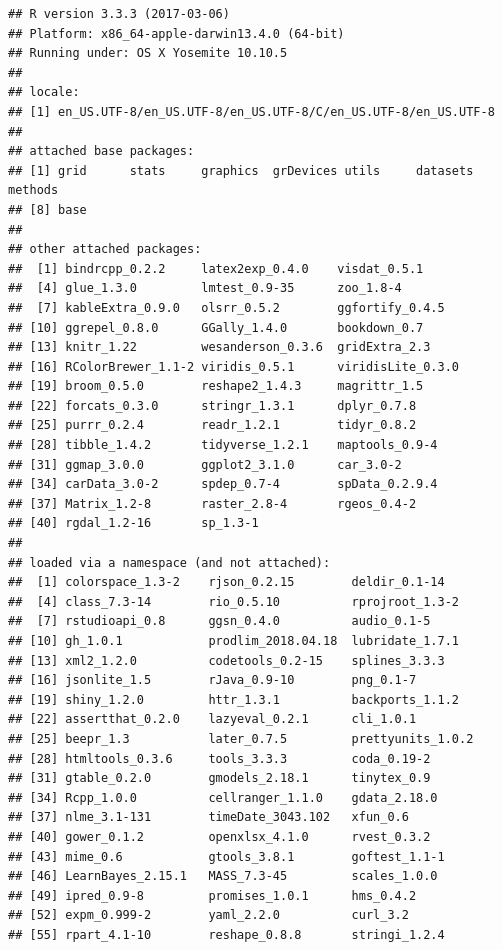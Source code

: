 \documentclass[12pt,a4paper,openany]{book}
\theoremstyle{definition}
\theoremstyle{definition}
\theoremstyle{definition}
\theoremstyle{remark}
\begin{document}
\begin{verbatim}
## R version 3.3.3 (2017-03-06)
## Platform: x86_64-apple-darwin13.4.0 (64-bit)
## Running under: OS X Yosemite 10.10.5
## 
## locale:
## [1] en_US.UTF-8/en_US.UTF-8/en_US.UTF-8/C/en_US.UTF-8/en_US.UTF-8
## 
## attached base packages:
## [1] grid      stats     graphics  grDevices utils     datasets  methods  
## [8] base     
## 
## other attached packages:
##  [1] bindrcpp_0.2.2     latex2exp_0.4.0    visdat_0.5.1      
##  [4] glue_1.3.0         lmtest_0.9-35      zoo_1.8-4         
##  [7] kableExtra_0.9.0   olsrr_0.5.2        ggfortify_0.4.5   
## [10] ggrepel_0.8.0      GGally_1.4.0       bookdown_0.7      
## [13] knitr_1.22         wesanderson_0.3.6  gridExtra_2.3     
## [16] RColorBrewer_1.1-2 viridis_0.5.1      viridisLite_0.3.0 
## [19] broom_0.5.0        reshape2_1.4.3     magrittr_1.5      
## [22] forcats_0.3.0      stringr_1.3.1      dplyr_0.7.8       
## [25] purrr_0.2.4        readr_1.2.1        tidyr_0.8.2       
## [28] tibble_1.4.2       tidyverse_1.2.1    maptools_0.9-4    
## [31] ggmap_3.0.0        ggplot2_3.1.0      car_3.0-2         
## [34] carData_3.0-2      spdep_0.7-4        spData_0.2.9.4    
## [37] Matrix_1.2-8       raster_2.8-4       rgeos_0.4-2       
## [40] rgdal_1.2-16       sp_1.3-1          
## 
## loaded via a namespace (and not attached):
##  [1] colorspace_1.3-2    rjson_0.2.15        deldir_0.1-14      
##  [4] class_7.3-14        rio_0.5.10          rprojroot_1.3-2    
##  [7] rstudioapi_0.8      ggsn_0.4.0          audio_0.1-5        
## [10] gh_1.0.1            prodlim_2018.04.18  lubridate_1.7.1    
## [13] xml2_1.2.0          codetools_0.2-15    splines_3.3.3      
## [16] jsonlite_1.5        rJava_0.9-10        png_0.1-7          
## [19] shiny_1.2.0         httr_1.3.1          backports_1.1.2    
## [22] assertthat_0.2.0    lazyeval_0.2.1      cli_1.0.1          
## [25] beepr_1.3           later_0.7.5         prettyunits_1.0.2  
## [28] htmltools_0.3.6     tools_3.3.3         coda_0.19-2        
## [31] gtable_0.2.0        gmodels_2.18.1      tinytex_0.9        
## [34] Rcpp_1.0.0          cellranger_1.1.0    gdata_2.18.0       
## [37] nlme_3.1-131        timeDate_3043.102   xfun_0.6           
## [40] gower_0.1.2         openxlsx_4.1.0      rvest_0.3.2        
## [43] mime_0.6            gtools_3.8.1        goftest_1.1-1      
## [46] LearnBayes_2.15.1   MASS_7.3-45         scales_1.0.0       
## [49] ipred_0.9-8         promises_1.0.1      hms_0.4.2          
## [52] expm_0.999-2        yaml_2.2.0          curl_3.2           
## [55] rpart_4.1-10        reshape_0.8.8       stringi_1.2.4      

\end{verbatim}
\end{document}
